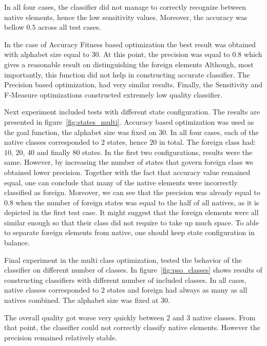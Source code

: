 \documentclass{mini}
\begin{document}
In all four cases, the classifier did not manage to correctly recognize between native elements, hence the low sensitivity values. Moreover, the accuracy was bellow $0.5$ across all test cases. 

In the case of Accuracy Fitness based optimization the best result was obtained with alphabet size equal to $30$. At this point, the precision was equal to $0.8$ which gives a reasonable result on distinguishing the foreign elements Although, most importantly, this function did not help in constructing accurate classifier. The Precision based optimization, had very similar results. Finally, the Sensitivity and F-Measure optimizations constructed extremely low quality classifier.

\makeFigureFitnessMulti

Next experiment included tests with different state configuration. The results are presented in figure~\ref{fig:states_multi}. Accuracy based optimization was used as the goal function, the alphabet size was fixed on $30$. In all four cases, each of the native classes corresponded to $2$ states, hence $20$ in total. The foreign class had: $10$, $20$, $40$ and finally $80$ states. In the first two configurations, results were the same. However, by increasing the number of states that govern foreign class we obtained lower precision. Together with the fact that accuracy value remained equal, one can conclude that many of the native elements were incorrectly classified as foreign. Moreover, we can see that the precision was already equal to $0.8$ when the number of foreign states was equal to the half of all natives, as it is depicted in the first test case. It might suggest that the foreign elements were all similar enough so that their class did not require to take up much space. To able to separate foreign elements from native, one should keep state configuration in balance.

\makeFigureStateConfigurationMulti

Final experiment in the multi class optimization, tested the behavior of the classifier on different number of classes. In figure~\ref{fig:pso_classes} shows results of constructing classifiers with different number of included classes. In all cases, native classes corresponded to $2$ states and foreign had always as many as all natives combined. The alphabet size was fixed at $30$.

The overall quality got worse very quickly between $2$ and $3$ native classes. From that point, the classifier could not correctly classify native elements. However the precision remained relatively stable.
\end{document}

